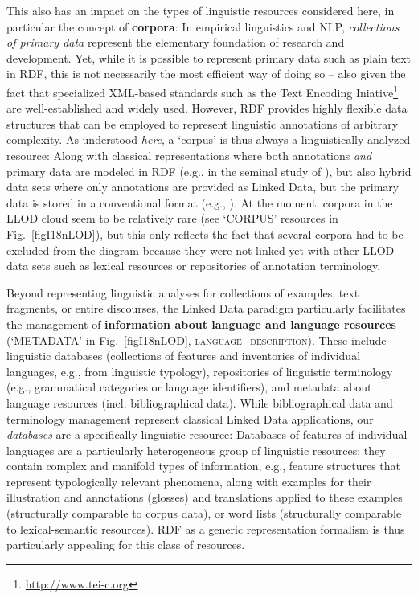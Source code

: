 This also has an impact on the types of linguistic resources considered here, in particular the concept of \textbf{corpora}:
In empirical linguistics and NLP, \emph{collections of primary data} represent the elementary foundation of research and development. 
Yet, while it is possible to represent primary data such as plain text in RDF, this is not necessarily the most efficient way of doing so -- also given the fact that specialized XML-based standards such as the Text Encoding Iniative\footnote{
	\url{http://www.tei-c.org}
}
are well-established and widely used.
However, RDF provides highly flexible data structures that can be employed to represent linguistic annotations of arbitrary complexity. 
As understood \emph{here}, a `corpus' is thus always a linguistically analyzed resource:
Along with classical representations where both annotations \emph{and} primary data are modeled in RDF (e.g., in the seminal study of \citep{burchardt2008formalising}), 
but also hybrid data sets where only annotations are provided as Linked Data, but the primary data is stored in a conventional format (e.g., \citep{cassidy2010rdf}).
At the moment, corpora in the LLOD cloud seem to be relatively rare (see `CORPUS' resources in Fig.\ \ref{figI18nLOD}), 
but this only reflects the fact that several corpora had to be excluded from the diagram because they were not linked yet with other LLOD data sets such as lexical resources or repositories of annotation terminology.

Beyond representing linguistic analyses for collections of examples, text fragments, or entire discourses, 
the Linked Data paradigm particularly facilitates the management of \textbf{information about language and language resources} (`METADATA' in Fig.\ \ref{figI18nLOD}, \textsc{language\_description}).
These include linguistic databases (collections of features and inventories of individual languages, e.g., from linguistic typology), repositories of linguistic terminology (e.g., grammatical categories or language identifiers), and metadata about language resources (incl. bibliographical data).
While bibliographical data and terminology management represent classical Linked Data applications, our \emph{databases} are a specifically linguistic resource:
Databases of features of individual languages are a particularly heterogeneous group of linguistic resources; they contain complex and manifold types of information, e.g., feature structures that represent typologically relevant phenomena, along with examples for their illustration and annotations (glosses) and translations applied to these examples (structurally comparable to corpus data), or word lists (structurally comparable to lexical-semantic resources). RDF as a generic representation formalism is thus particularly appealing for this class of resources.

